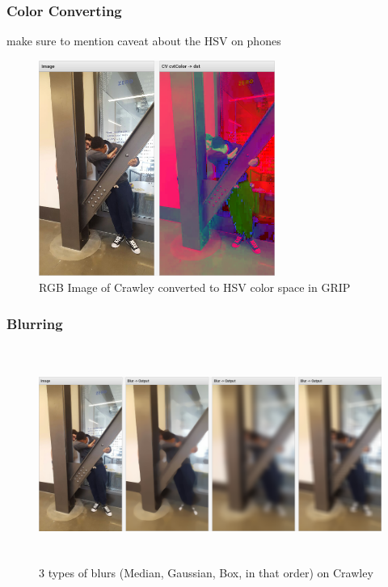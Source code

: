 \documentclass[../main.tex]{subfiles}
\begin{document}
\subsubsection{Color Converting}
make sure to mention caveat about the HSV on phones
\begin{figure}[H]
    \centering
    \includegraphics[height=200pt]{sections/vision/images/opencv/crawley/crawleyHSVTransform.png}
    \caption{RGB Image of Crawley converted to HSV color space in GRIP}
\end{figure}

\subsubsection{Blurring}
\begin{figure}[H]
    \centering
    \includegraphics[height=200pt]{sections/vision/images/opencv/crawley/crawleyBlursMedianGaussianBox.png}
    \caption{3 types of blurs (Median, Gaussian, Box, in that order) on Crawley}
\end{figure}
\end{document}
